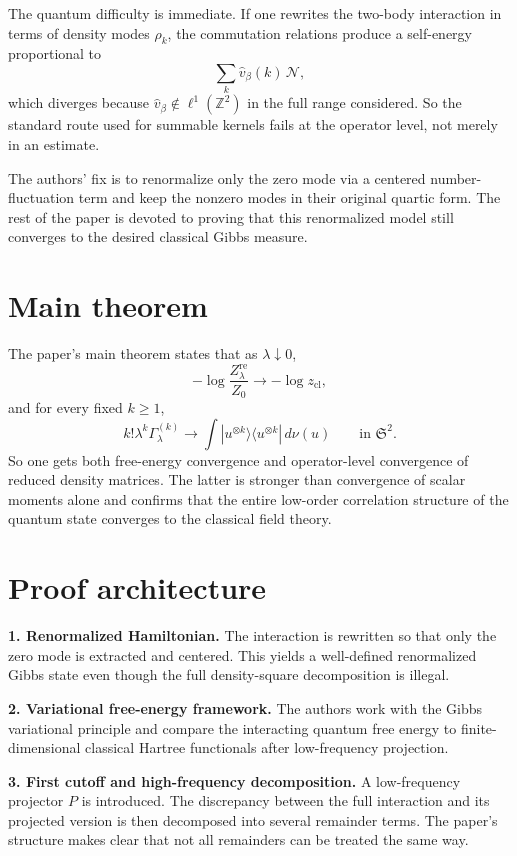 \documentclass[11pt]{article}
\begin{document}
The quantum difficulty is immediate. If one rewrites the two-body interaction in terms of density modes $\rho_k$, the commutation relations produce a self-energy proportional to
\[
\sum_k \widehat v_\beta(k)\,\mathcal N,
\]
which diverges because $\widehat v_\beta\notin \ell^1(\mathbb Z^2)$ in the full range considered. So the standard route used for summable kernels fails at the operator level, not merely in an estimate.

The authors' fix is to renormalize only the zero mode via a centered number-fluctuation term and keep the nonzero modes in their original quartic form. The rest of the paper is devoted to proving that this renormalized model still converges to the desired classical Gibbs measure.

\section*{Main theorem}
The paper's main theorem states that as $\lambda\downarrow0$,
\[
-\log \frac{Z_\lambda^{\mathrm{re}}}{Z_0}\to -\log z_{\mathrm{cl}},
\]
and for every fixed $k\ge 1$,
\[
k!\lambda^k\Gamma_\lambda^{(k)}\longrightarrow \int |u^{\otimes k}\rangle\langle u^{\otimes k}|\,d\nu(u)
\qquad\text{in }\mathfrak S^2.
\]
So one gets both free-energy convergence and operator-level convergence of reduced density matrices. The latter is stronger than convergence of scalar moments alone and confirms that the entire low-order correlation structure of the quantum state converges to the classical field theory.

\section*{Proof architecture}
\textbf{1. Renormalized Hamiltonian.} The interaction is rewritten so that only the zero mode is extracted and centered. This yields a well-defined renormalized Gibbs state even though the full density-square decomposition is illegal.

\textbf{2. Variational free-energy framework.} The authors work with the Gibbs variational principle and compare the interacting quantum free energy to finite-dimensional classical Hartree functionals after low-frequency projection.

\textbf{3. First cutoff and high-frequency decomposition.} A low-frequency projector $P$ is introduced. The discrepancy between the full interaction and its projected version is then decomposed into several remainder terms. The paper's structure makes clear that not all remainders can be treated the same way.
\end{document}
